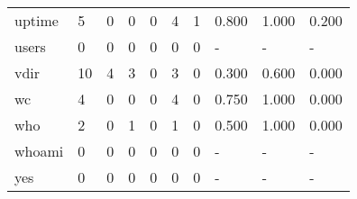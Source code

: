 \begin{longtable}{lp{1.3cm}p{1.3cm}p{1.3cm}p{1.3cm}p{1.3cm}p{1.3cm}p{1.3cm}p{1.3cm}p{1.3cm}}
uptime    &                      5 &                                  0 &                                 0 &                                0 &                                 4 &                               1 &                                0.800 &                                  1.000 &                                0.200 \\
users     &                      0 &                                  0 &                                 0 &                                0 &                                 0 &                               0 &                                    - &                                      - &                                    - \\
vdir      &                     10 &                                  4 &                                 3 &                                0 &                                 3 &                               0 &                                0.300 &                                  0.600 &                                0.000 \\
wc        &                      4 &                                  0 &                                 0 &                                0 &                                 4 &                               0 &                                0.750 &                                  1.000 &                                0.000 \\
who       &                      2 &                                  0 &                                 1 &                                0 &                                 1 &                               0 &                                0.500 &                                  1.000 &                                0.000 \\
whoami    &                      0 &                                  0 &                                 0 &                                0 &                                 0 &                               0 &                                    - &                                      - &                                    - \\
yes       &                      0 &                                  0 &                                 0 &                                0 &                                 0 &                               0 &                                    - &                                      - &                                    - \\
\end{longtable}
